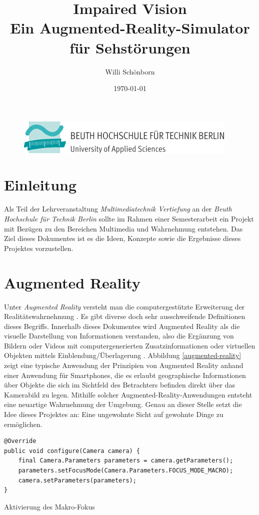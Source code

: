 \documentclass[a4paper]{article}
\title{Impaired Vision \\ Ein Augmented-Reality-Simulator für Sehstörungen}
\author{Willi Schönborn}
\date{\today}
\begin{document}
\begin{figure}[H]
\centering
\includegraphics{beuth.png}
\maketitle
\end{figure}

\section*{Einleitung}
Als Teil der Lehrveranstaltung \textit{Multimediatechnik Vertiefung} an der \textit{Beuth Hochschule für Technik Berlin} sollte im Rahmen einer Semesterarbeit ein Projekt mit Bezügen zu den Bereichen Multimedia und Wahrnehmung entstehen. Das Ziel dieses Dokumentes ist es die Ideen, Konzepte sowie die Ergebnisse dieses Projektes vorzustellen.

\section*{Augmented Reality}
Unter \textit{Augmented Reality} versteht man die computergestützte Erweiterung der Realitätswahrnehmung \cite{WP-AR}. Es gibt diverse doch sehr ausschweifende Definitionen dieses Begriffs. Innerhalb dieses Dokumentes wird Augmented Reality als die visuelle Darstellung von Informationen verstanden, also die Ergänzung von Bildern oder Videos mit computergenerierten Zusatzinformationen oder virtuellen Objekten mittels Einblendung/Überlagerung \cite{WP-AR}. Abbildung \ref{augmented-reality} zeigt eine typische Anwendung der Prinzipien von Augmented Reality anhand einer Anwendung für Smartphones, die es erlaubt geographische Informationen über Objekte die sich im Sichtfeld des Betrachters befinden direkt über das Kamerabild zu legen. Mithilfe solcher Augmented-Reality-Anwendungen entsteht eine neuartige Wahrnehmung der Umgebung. Genau an dieser Stelle setzt die Idee dieses Projektes an: Eine ungewohnte Sicht auf gewohnte Dinge zu ermöglichen.

\begin{listing}[H]
\begin{verbatim}
@Override
public void configure(Camera camera) {
    final Camera.Parameters parameters = camera.getParameters();
    parameters.setFocusMode(Camera.Parameters.FOCUS_MODE_MACRO);
    camera.setParameters(parameters);
}
\end{verbatim}
\caption{Aktivierung des Makro-Fokus}
\label{macro-focus}
\end{listing}

\printbibliography

\listoffigures

\renewcommand\listoflistingscaption{Quellcodeverzeichnis}
\listoflistings
\end{document}
